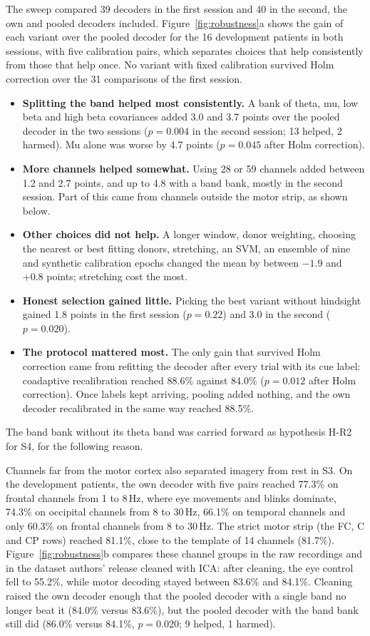 \documentclass[pdflatex,sn-mathphys-num]{sn-jnl}
\begin{document}
The sweep compared 39 decoders in the first session and 40 in the second, the own and pooled decoders included. Figure~\ref{fig:robustness}a shows the gain of each variant over the pooled decoder for the 16 development patients in both sessions, with five calibration pairs, which separates choices that help consistently from those that help once. No variant with fixed calibration survived Holm correction over the 31 comparisons of the first session.
\begin{itemize}
\item \textbf{Splitting the band helped most consistently.} A bank of theta, mu, low beta and high beta covariances added 3.0 and 3.7 points over the pooled decoder in the two sessions ($p = 0.004$ in the second session; 13 helped, 2 harmed). Mu alone was worse by 4.7 points ($p = 0.045$ after Holm correction).
\item \textbf{More channels helped somewhat.} Using 28 or 59 channels added between 1.2 and 2.7 points, and up to 4.8 with a band bank, mostly in the second session. Part of this came from channels outside the motor strip, as shown below.
\item \textbf{Other choices did not help.} A longer window, donor weighting, choosing the nearest or best fitting donors, stretching, an SVM, an ensemble of nine and synthetic calibration epochs changed the mean by between $-1.9$ and $+0.8$ points; stretching cost the most.
\item \textbf{Honest selection gained little.} Picking the best variant without hindsight gained 1.8 points in the first session ($p = 0.22$) and 3.0 in the second ($p = 0.020$).
\item \textbf{The protocol mattered most.} The only gain that survived Holm correction came from refitting the decoder after every trial with its cue label: coadaptive recalibration reached 88.6\% against 84.0\% ($p = 0.012$ after Holm correction). Once labels kept arriving, pooling added nothing, and the own decoder recalibrated in the same way reached 88.5\%.
\end{itemize}
The band bank without its theta band was carried forward as hypothesis H-R2 for S4, for the following reason.

Channels far from the motor cortex also separated imagery from rest in S3. On the development patients, the own decoder with five pairs reached 77.3\% on frontal channels from 1 to 8\,Hz, where eye movements and blinks dominate, 74.3\% on occipital channels from 8 to 30\,Hz, 66.1\% on temporal channels and only 60.3\% on frontal channels from 8 to 30\,Hz. The strict motor strip (the FC, C and CP rows) reached 81.1\%, close to the template of 14 channels (81.7\%). Figure~\ref{fig:robustness}b compares these channel groups in the raw recordings and in the dataset authors' release cleaned with ICA: after cleaning, the eye control fell to 55.2\%, while motor decoding stayed between 83.6\% and 84.1\%. Cleaning raised the own decoder enough that the pooled decoder with a single band no longer beat it (84.0\% versus 83.6\%), but the pooled decoder with the band bank still did (86.0\% versus 84.1\%, $p = 0.020$; 9 helped, 1 harmed).
\end{document}
